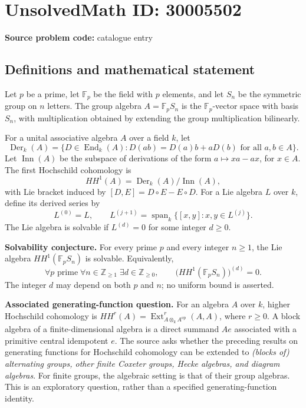 \documentclass[11pt]{article}
\newcommand{\Z}{\mathbb{Z}}
\newcommand{\F}{\mathbb{F}}
\begin{document}
\section*{UnsolvedMath ID: 30005502}
\textbf{Source problem code:} catalogue entry
\subsection{Definitions and mathematical statement}
Let \(p\) be a prime, let \(\F_p\) be the field with \(p\) elements, and let \(S_n\) be the symmetric group on \(n\) letters. The group algebra \(A=\F_pS_n\) is the \(\F_p\)-vector space with basis \(S_n\), with multiplication obtained by extending the group multiplication bilinearly.

For a unital associative algebra \(A\) over a field \(k\), let
\[
\operatorname{Der}_k(A)=\{D\in\operatorname{End}_k(A):D(ab)=D(a)b+aD(b)\text{ for all }a,b\in A\}.
\]
Let \(\operatorname{Inn}(A)\) be the subspace of derivations of the form \(a\mapsto xa-ax\), for \(x\in A\). The first Hochschild cohomology is
\[
HH^1(A)=\operatorname{Der}_k(A)/\operatorname{Inn}(A),
\]
with Lie bracket induced by \([D,E]=D\circ E-E\circ D\). For a Lie algebra \(L\) over \(k\), define its derived series by
\[
L^{(0)}=L,\qquad L^{(j+1)}=\operatorname{span}_k\{[x,y]:x,y\in L^{(j)}\}.
\]
The Lie algebra is solvable if \(L^{(d)}=0\) for some integer \(d\geq0\).

\textbf{Solvability conjecture.} For every prime \(p\) and every integer \(n\geq1\), the Lie algebra \(HH^1(\F_pS_n)\) is solvable. Equivalently,
\[
\forall p\text{ prime}\;\forall n\in\Z_{\geq1}\;\exists d\in\Z_{\geq0},
\qquad \bigl(HH^1(\F_pS_n)\bigr)^{(d)}=0.
\]
The integer \(d\) may depend on both \(p\) and \(n\); no uniform bound is asserted.

\textbf{Associated generating-function question.} For an algebra \(A\) over \(k\), higher Hochschild cohomology is \(HH^r(A)=\operatorname{Ext}_{A\otimes_k A^{\mathrm{op}}}^{r}(A,A)\), where \(r\geq0\). A block algebra of a finite-dimensional algebra is a direct summand \(Ae\) associated with a primitive central idempotent \(e\). The source asks whether the preceding results on generating functions for Hochschild cohomology can be extended to \emph{(blocks of) alternating groups, other finite Coxeter groups, Hecke algebras, and diagram algebras}. For finite groups, the algebraic setting is that of their group algebras. This is an exploratory question, rather than a specified generating-function identity.
\end{document}
